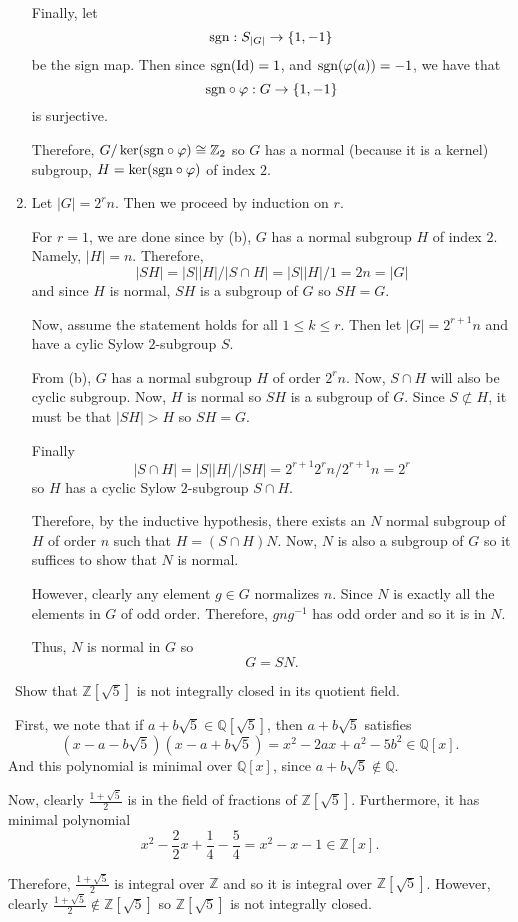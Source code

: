 \documentclass[12pt]{AlgebraQual}
\begin{document}
\begin{solution}
\begin{enumerate}[label=(\alph*)]
    Finally, let $$\text{sgn}:S_{|G|}\to \{1,-1\}$$ be the sign map. Then since $\text{sgn}(\text{Id})=1$, and $\text{sgn}(\varphi(a))=-1$, we have that $$\text{sgn}\circ\varphi:G\to \{1,-1\}$$ is surjective.

    Therefore, $G/\ker(\text{sgn}\circ\varphi)\cong\mathbb{Z}_2$ so $G$ has a normal (because it is a kernel) subgroup, $H=\ker(\text{sgn}\circ\varphi)$ of index $2$.

    \item Let $|G|=2^rn$. Then we proceed by induction on $r$.

    For $r=1$, we are done since by (b), $G$ has a normal subgroup $H$ of index $2$. Namely, $|H|=n$. Therefore, $$|SH|=|S||H|/|S\cap H|=|S||H|/1=2n=|G|$$ and since $H$ is normal, $SH$ is a subgroup of $G$ so $SH=G$.

    Now, assume the statement holds for all $1\le k\le r$. Then let $|G|=2^{r+1}n$ and have a cylic Sylow $2$-subgroup $S$.

    From (b), $G$ has a normal subgroup $H$ of order $2^rn$. Now, $S\cap H$ will also be cyclic subgroup. Now, $H$ is normal so $SH$ is a subgroup of $G$. Since $S\not\subset H$, it must be that $|SH|>H$ so $SH=G$.

    Finally $$|S\cap H|=|S||H|/|SH|=2^{r+1}2^rn/2^{r+1}n=2^r$$ so $H$ has a cyclic Sylow $2$-subgroup $S\cap H$.

    Therefore, by the inductive hypothesis, there exists an $N$ normal subgroup of $H$ of order $n$ such that $H=(S\cap H)N$. Now, $N$ is also a subgroup of $G$ so it suffices to show that $N$ is normal.

    However, clearly any element $g\in G$ normalizes $n$. Since $N$ is exactly all the elements in $G$ of odd order. Therefore, $gng^{-1}$ has odd order and so it is in $N$.

    Thus, $N$ is normal in $G$ so $$G=SN.$$
\end{enumerate}
\end{solution}
\newpage


\begin{problem} $\,$
Show that $\mathbb{Z}[\sqrt{5}]$ is not integrally closed in its quotient field.
\end{problem}


\begin{solution}$\,$
First, we note that if $a+b\sqrt{5}\in\mathbb{Q}[\sqrt{5}]$, then $a+b\sqrt{5}$ satisfies $$(x-a-b\sqrt{5})(x-a+b\sqrt{5})=x^2-2ax+a^2-5b^2\in\mathbb{Q}[x].$$ And this polynomial is minimal over $\mathbb{Q}[x]$, since $a+b\sqrt{5}\notin\mathbb{Q}$.

Now, clearly $\frac{1+\sqrt{5}}{2}$ is in the field of fractions of $\mathbb{Z}[\sqrt{5}]$. Furthermore, it has minimal polynomial $$x^2-\frac{2}{2}x+\frac{1}{4}-\frac{5}{4}=x^2-x-1\in\mathbb{Z}[x].$$

Therefore, $\frac{1+\sqrt{5}}{2}$ is integral over $\mathbb{Z}$ and so it is integral over $\mathbb{Z}[\sqrt{5}]$. However, clearly $\frac{1+\sqrt{5}}{2}\notin\mathbb{Z}[\sqrt{5}]$ so $\mathbb{Z}[\sqrt{5}]$ is not integrally closed.
\end{solution}
\newpage
\end{document}
